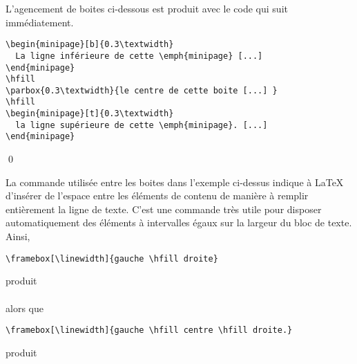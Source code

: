 \begin{exemple}
  L'agencement de boites ci-dessous est produit avec le code qui suit
  immédiatement.  \\[0.5\baselineskip]
  \begin{minipage}{\textwidth}
    \makebox[0pt][l]{\color{lightgray}\rule{\textwidth}{0.7pt}}\relax
     \hfill {}
    \hfill {}
  \end{minipage}
\begin{lstlisting}
\begin{minipage}[b]{0.3\textwidth}
  La ligne inférieure de cette \emph{minipage} [...]
\end{minipage}
\hfill
\parbox{0.3\textwidth}{le centre de cette boite [...] }
\hfill
\begin{minipage}[t]{0.3\textwidth}
  la ligne supérieure de cette \emph{minipage}. [...]
\end{minipage}
\end{lstlisting}
  \qed
\end{exemple}

La commande \cmd{\hfill} utilisée entre les boites dans l'exemple
ci-dessus indique à {\LaTeX} d'insérer de l'espace entre les éléments
de contenu de manière à remplir entièrement la ligne de texte. C'est
une commande très utile pour disposer automatiquement des éléments à
intervalles égaux sur la largeur du bloc de texte. Ainsi,
\begin{lstlisting}
\framebox[\linewidth]{gauche \hfill droite}
\end{lstlisting}
produit \\[0.5\baselineskip]
 \\[0.5\baselineskip]
alors que
\begin{lstlisting}
\framebox[\linewidth]{gauche \hfill centre \hfill droite.}
\end{lstlisting}
produit \\[0.5\baselineskip]



